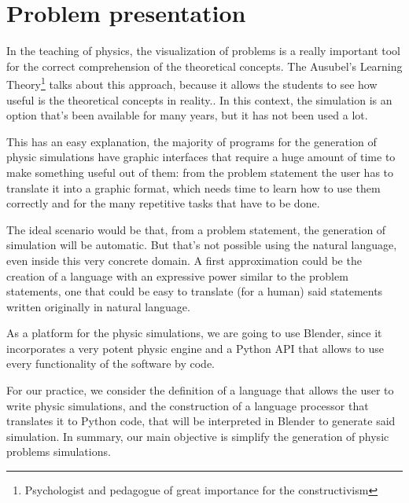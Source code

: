 \documentclass[12pt]{article}
\begin{document}

\tableofcontents
\pagebreak


\section{Problem presentation}

In the teaching of physics, the visualization of problems is a really important tool for the correct comprehension of the theoretical concepts. The Ausubel's Learning Theory\footnote{Psychologist and pedagogue of great importance for the constructivism} talks about this approach, because it allows the students to see how useful is the theoretical concepts in reality\cite{ausubel1983teoria}.. In this context, the simulation is an option that's been available for many years, but it has not been used a lot.

This has an easy explanation, the majority of programs for the generation of physic simulations have graphic interfaces that require a huge amount of time to make something useful out of them: from the problem statement the user has to translate it into a graphic format, which needs time to learn how to use them correctly and for the many repetitive tasks that have to be done.

The ideal scenario would be that, from a problem statement, the generation of simulation will be automatic. But that's not possible using the natural language, even inside this very concrete domain. A first approximation could be the creation of a language with an expressive power similar to the problem statements, one that could be easy to translate (for a human) said statements written originally in natural language.

As a platform for the physic simulations, we are going to use Blender, since it incorporates a very potent physic engine and a Python API that allows to use every functionality of the software by code.

For our practice, we consider the definition of a language that allows the user to write physic simulations, and the construction of a language processor that translates it to Python code, that will be interpreted in Blender to generate said simulation. In summary, our main objective is simplify the generation of physic problems simulations.
\end{document}
